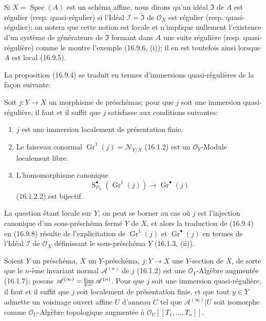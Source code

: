 \begin{env}[16.9.7]
Si $X=\operatorname{Spec}(A)$ est un schéma affine, nous dirons qu'un idéal
$\mathfrak{I}$ de $A$ est régulier (resp. quasi-régulier) si l'Idéal
$\mathscr{I}=\widetilde{\mathfrak{I}}$ de $\mathcal{O}_X$ est régulier
(resp. quasi-régulier); on notera que cette notion est locale et n'implique
nullement l'existence d'un système de générateurs de $\mathfrak{I}$ formant
dans $A$ une suite régulière (resp. quasi-régulière) comme le montre l'exemple
(16.9.6, (i)); il en est toutefois ainsi lorsque $A$ est local (16.9.5).

La proposition (16.9.4) se traduit en termes d'immersions quasi-régulières de
la façon suivante:
\end{env}

\begin{proposition}[16.9.8]
\label{IV.16.9.8}
Soit $j:Y\to X$ un morphisme de préschémas; pour que $j$ soit une immersion
quasi-régulière, il faut et il suffit que $j$ satisfasse aux conditions
suivantes:
\begin{enumerate}
  \item[(i)] $j$ est une immersion localement de présentation finie.
  \item[(ii)] Le faisceau conormal
  $\operatorname{Gr}^1(j)=\mathcal{N}_{Y/X}$ (16.1.2) est un
  $\mathcal{O}_Y$-Module localement libre.
  \item[(iii)] L'homomorphisme canonique
  \[
    \operatorname{S}_{\mathcal{O}_Y}^{\bullet}
      (\operatorname{Gr}^1(j))\longrightarrow\operatorname{Gr}^{\bullet}(j)
  \]
  (16.1.2.2) est bijectif.
\end{enumerate}
\end{proposition}

La question étant locale sur $Y$, on peut se borner au cas où $j$ est
l'injection canonique d'un sous-préschéma fermé $Y$ de $X$, et alors la
traduction de (16.9.4) en (16.9.8) résulte de l'explicitation de
$\operatorname{Gr}^1(j)$ et $\operatorname{Gr}^{\bullet}(j)$ en termes de
l'Idéal $\mathscr{I}$ de $\mathcal{O}_X$ définissant le sous-préschéma $Y$
(16.1.3, (ii)).

\begin{corollary}[16.9.9]
\label{IV.16.9.9}
Soient $Y$ un préschéma, $X$ un $Y$-préschéma, $j:Y\to X$ une $Y$-section
de $X$, de sorte que le $n$-ème invariant normal $\mathscr{A}^{(n)}$ de $j$
(16.1.2) est une $\mathcal{O}_Y$-Algèbre augmentée (16.1.7); posons
$\mathscr{A}^{(\infty)}=\varprojlim\mathscr{A}^{(n)}$. Pour que $j$ soit une
immersion quasi-régulière, il faut et il suffit que $j$ soit localement de
présentation finie, et que tout $y\in Y$ admette un voisinage ouvert affine
$U$ d'anneau $C$ tel que $\mathscr{A}^{(\infty)}|U$ soit isomorphe comme
$\mathcal{O}_U$-Algèbre topologique augmentée à
$\mathcal{O}_U[[T_1,\ldots,T_n]]$.
\end{corollary}

